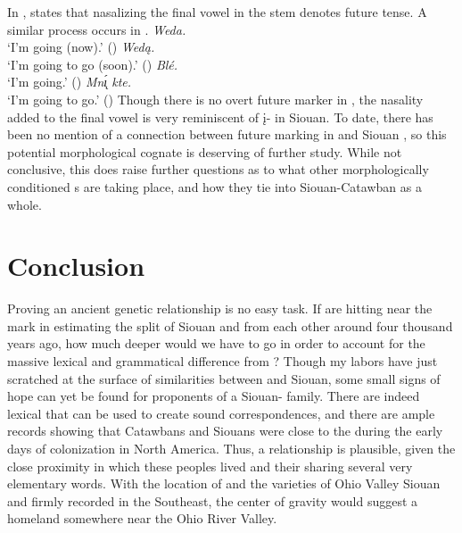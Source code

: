 \documentclass[output=paper]{LSP/langsci}
\begin{document}
In , \citet{Linn2000} states that nasalizing the final vowel in the stem denotes future tense. A similar process occurs in .
\ea
	\ea \textit{Weda.} \hfill {}\\
		`I'm going (now).' (\citealt[279]{Linn2000})
	\ex \textit{Wed\k{a}.} \hfill {}\\
		`I'm going to go (soon).' (\citealt[279]{Linn2000})
	\ex \textit{Blé.} \hfill {}\\
		`I'm going.' (\citealt[75]{Ullrich2008})
	\ex \textit{Mn\k{\'\i} kte.} \hfill {}\\
		`I'm going to go.' (\citealt[75]{Ullrich2008})
	\z
\z
Though there is no overt future marker in , the nasality added to the final vowel is very reminiscent of \k{i}- in Siouan. To date, there has been no mention of a connection between future marking in  and Siouan , so this potential morphological cognate is deserving of further study. While not conclusive, this  does raise further questions as to what other morphologically conditioned s are taking place, and how they tie into Siouan-Catawban as a whole.

\section{Conclusion}\label{sec:kasak:6}

Proving an ancient genetic relationship is no easy task. If \citet{ParksRankin2001} are hitting near the mark in estimating the split of Siouan and  from each other around four thousand years ago, how much deeper would we have to go in order to account for the massive lexical and grammatical difference from ? Though my labors have just scratched at the surface of similarities between  and Siouan, some small signs of hope can yet be found for proponents of a Siouan- family. There are indeed lexical  that can be used to create sound correspondences, and there are ample records showing that Catawbans and Siouans were close to the  during the early days of colonization in North America. Thus, a relationship is plausible, given the close proximity in which these peoples lived and their sharing several very elementary words. With the location of  and the varieties of Ohio Valley Siouan and  firmly recorded in the Southeast, the center of gravity would suggest a homeland somewhere near the Ohio River Valley.
\end{document}
